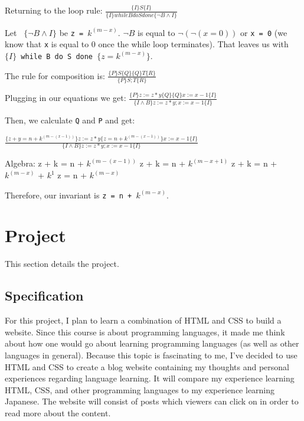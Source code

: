 \documentclass{article}
\theoremstyle{theorem}
\theoremstyle{definition}
\theoremstyle{remark}
\begin{document}
\medskip\noindent
Returning to the loop rule:
\medskip
\texttt{$\frac{\{I\} S \{I\}} {\{I\} while B do S done \{ \neg B \wedge I \}}$}

\medskip\noindent
Let \texttt{ $\{ \neg B \wedge I \}$} be \texttt{z = $k^{(m - x)}$}. \texttt{$\neg B$} is equal to \texttt{$\neg(\neg(x = 0))$} or \texttt{x = 0} (we know that \texttt{x} is equal to 0 once the while loop terminates). That leaves us with \texttt{$\{I\}$ while B do S done $\{ z = k^{(m - x)} \}$}. 

\medskip\noindent
The rule for composition is:
\medskip
\texttt{$\frac{\{P\} S \{Q\}     \{Q\} T \{R\}} {\{P\} S; T \{R \}}$}

\medskip\noindent
Plugging in our equations we get:
\medskip
\texttt{$\frac{\{P\} z := z * y \{Q\}     \{Q\} x := x - 1 \{I\}} {\{I \wedge B\} z := z * y; x := x - 1 \{I \}}$}

\medskip\noindent
Then, we calculate \texttt{Q}  and \texttt{P} and get:

\medskip
\texttt{$\frac{\{z + y = n + k^{(m - (x - 1))}\} z := z * y \{z = n + k^{(m - (x - 1))}\} x := x - 1 \{I\}} {\{I \wedge B\} z := z * y; x := x - 1 \{I \}}$}

\medskip\noindent
Algebra:
\newline\indent z + k = n + $k^{(m - (x -1))}$
\newline\indent z + k = n + $k^{(m - x + 1)}$
\newline\indent z + k = n + $k^{(m - x)}$ + $k^1$
\newline\indent z = n + $k^{(m - x)}$

\medskip\noindent
Therefore, our invariant is \texttt{z = n + $k^{(m - x)}$}.

 
\section{Project}

This section details the project.

\subsection{Specification}
For this project, I plan to learn a combination of HTML and CSS to build a website. Since this course is about programming languages, it made me think about how one would go about learning programming languages (as well as other languages in general). Because this topic is fascinating to me, I've decided to use HTML and CSS to create a blog website containing my thoughts and personal experiences regarding language learning. It will compare my experience learning HTML, CSS, and other programming languages to my experience learning Japanese. The website will consist of posts which viewers can click on in order to read more about the content.
\end{document}
